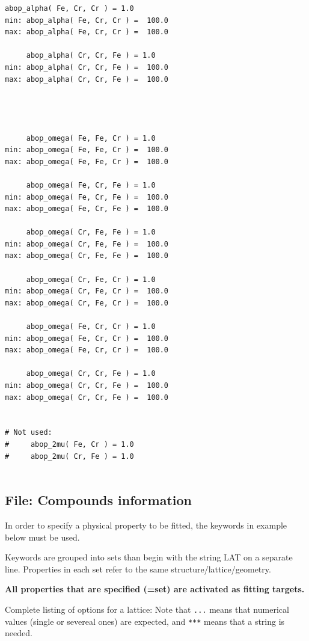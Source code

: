 \documentclass[a4paper,12pt,pdftex,onecolumn]{article}
\begin{document}
\begin{Verbatim}[fontsize=\relsize{-1},frame=single]
     abop_alpha( Fe, Cr, Cr ) = 1.0
min: abop_alpha( Fe, Cr, Cr ) =  100.0
max: abop_alpha( Fe, Cr, Cr ) =  100.0

     abop_alpha( Cr, Cr, Fe ) = 1.0
min: abop_alpha( Cr, Cr, Fe ) =  100.0
max: abop_alpha( Cr, Cr, Fe ) =  100.0




     abop_omega( Fe, Fe, Cr ) = 1.0
min: abop_omega( Fe, Fe, Cr ) =  100.0
max: abop_omega( Fe, Fe, Cr ) =  100.0

     abop_omega( Fe, Cr, Fe ) = 1.0
min: abop_omega( Fe, Cr, Fe ) =  100.0
max: abop_omega( Fe, Cr, Fe ) =  100.0

     abop_omega( Cr, Fe, Fe ) = 1.0
min: abop_omega( Cr, Fe, Fe ) =  100.0
max: abop_omega( Cr, Fe, Fe ) =  100.0

     abop_omega( Cr, Fe, Cr ) = 1.0
min: abop_omega( Cr, Fe, Cr ) =  100.0
max: abop_omega( Cr, Fe, Cr ) =  100.0

     abop_omega( Fe, Cr, Cr ) = 1.0
min: abop_omega( Fe, Cr, Cr ) =  100.0
max: abop_omega( Fe, Cr, Cr ) =  100.0

     abop_omega( Cr, Cr, Fe ) = 1.0
min: abop_omega( Cr, Cr, Fe ) =  100.0
max: abop_omega( Cr, Cr, Fe ) =  100.0


# Not used:
#     abop_2mu( Fe, Cr ) = 1.0
#     abop_2mu( Cr, Fe ) = 1.0


\end{Verbatim}








\subsection{File: Compounds information}

In order to specify a physical property to be fitted,
the keywords in example below must be used.

Keywords are grouped into sets than begin with the string
LAT on a separate line. Properties in each set refer to
the same structure/lattice/geometry.

\textbf{All properties that are specified (=set) are activated as fitting
targets.}


Complete listing of options for a lattice: Note that \verb+...+ means that
numerical values (single or severeal ones) are expected, and \verb+***+ means
that a string is needed.
\end{document}
